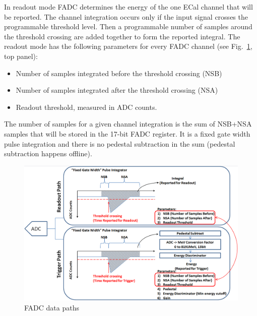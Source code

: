  In readout mode FADC determines the energy of the one ECal channel that will be reported. 
The channel integration occurs only if the input signal crosses the programmable threshold level.  Then a programmable number of samples around the threshold crossing are added together to form the reported integral.  The readout  mode has the following parameters for every FADC channel (see Fig.~\ref{fig:hps_trigger_data}, top panel):
 \begin{itemize}
 \item Number of samples integrated before the threshold crossing (NSB)
 \item Number of samples integrated after the  threshold crossing (NSA)
 \item Readout threshold, measured in ADC counts.
 \end{itemize}
 
The number of samples for a given channel integration  is the sum of NSB+NSA samples that will be stored in  
 the 17-bit FADC register. It is a fixed gate width pulse integration and there is no pedestal subtraction in the sum (pedestal subtraction happens offline).
 

 

\begin{figure}[t]
\includegraphics[scale=0.4]{daq_trigger/figures/hps_trigger_data}
\caption{\small{FADC data paths}}
\label{fig:hps_trigger_data}
\end{figure}

